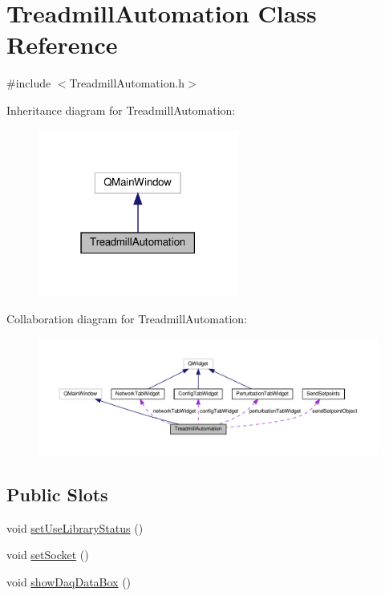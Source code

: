 \hypertarget{class_treadmill_automation}{}\section{Treadmill\+Automation Class Reference}
\label{class_treadmill_automation}


{\ttfamily \#include $<$Treadmill\+Automation.\+h$>$}



Inheritance diagram for Treadmill\+Automation\+:
\nopagebreak
\begin{figure}[H]
\begin{center}
\leavevmode
\includegraphics[width=186pt]{class_treadmill_automation__inherit__graph}
\end{center}
\end{figure}


Collaboration diagram for Treadmill\+Automation\+:
\nopagebreak
\begin{figure}[H]
\begin{center}
\leavevmode
\includegraphics[width=350pt]{class_treadmill_automation__coll__graph}
\end{center}
\end{figure}
\subsection*{Public Slots}
\begin{DoxyCompactItemize}
\item 
void \hyperlink{class_treadmill_automation_affefe22059a06d2113ea25c5a4277f8d}{set\+Use\+Library\+Status} ()
\item 
void \hyperlink{class_treadmill_automation_ab3509d1863460a2f8a419e067c3608a1}{set\+Socket} ()
\item 
void \hyperlink{class_treadmill_automation_a2c95c71e2ab52800e415565c9f59838c}{show\+Daq\+Data\+Box} ()
\end{DoxyCompactItemize}
